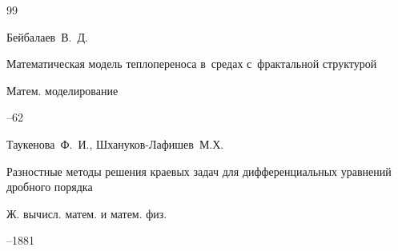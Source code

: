 \begin{thebibliography}{99}

\by Бейбалаев~В.~Д. 

\paper Математическая модель теплопереноса в~средах с~фрактальной структурой

\jour Матем. моделирование




--62














\by Таукенова~Ф.~И., Шхануков-Лафишев~М.Х.

\paper Разностные методы решения краевых задач для дифференциальных уравнений дробного порядка

\jour Ж. вычисл. матем. и матем. физ.




--1881














\end{thebibliography}
